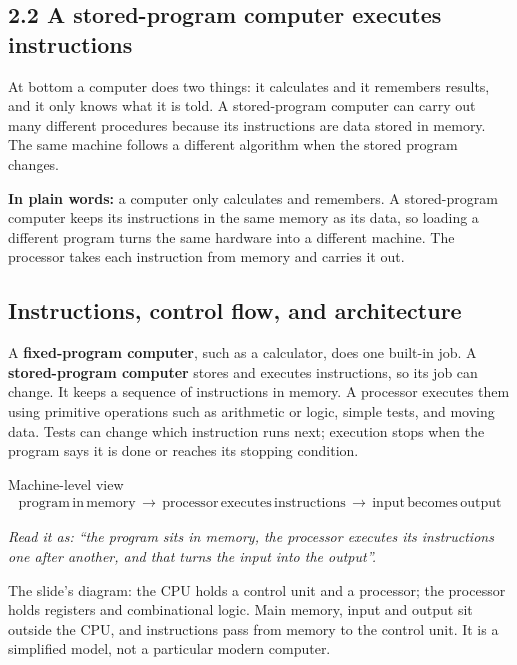 \documentclass[11pt]{article}
\begin{document}
\begin{keepsection}
\section{2.2 A stored-program computer executes instructions}

At bottom a computer does two things: it calculates and it remembers results, and it only knows what it is told. A stored-program computer can carry out many different procedures because its instructions are data stored in memory. The same machine follows a different algorithm when the stored program changes.

\begin{plainbox}\textbf{In plain words:} a computer only calculates and remembers. A stored-program computer keeps its instructions in the same memory as its data, so loading a different program turns the same hardware into a different machine. The processor takes each instruction from memory and carries it out.\end{plainbox}

\begin{keepsection}
\subsection{Instructions, control flow, and architecture}

A \textbf{fixed-program computer}, such as a calculator, does one built-in job. A \textbf{stored-program computer} stores and executes instructions, so its job can change. It keeps a sequence of instructions in memory. A processor executes them using primitive operations such as arithmetic or logic, simple tests, and moving data. Tests can change which instruction runs next; execution stops when the program says it is done or reaches its stopping condition.

\begin{equationcard}{Machine-level view}
\[ \begin{gathered} \text{program}\, \text{in}\, \text{memory}\, \to \, \text{processor}\, \text{executes}\, \text{instructions}\, \to \, \text{input}\, \text{becomes}\, \text{output} \end{gathered} \]
{\small \emph{Read it as: “the program sits in memory, the processor executes its instructions one after another, and that turns the input into the output”.}\par The slide's diagram: the CPU holds a control unit and a processor; the processor holds registers and combinational logic. Main memory, input and output sit outside the CPU, and instructions pass from memory to the control unit. It is a simplified model, not a particular modern computer.}
\end{equationcard}


\end{keepsection}
\end{keepsection}
\end{document}
